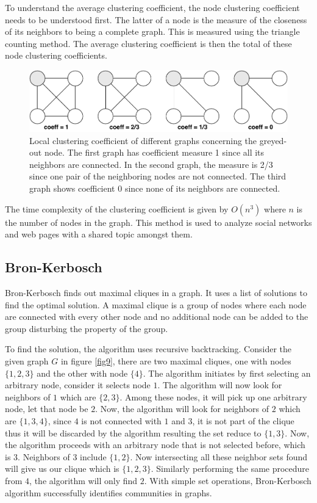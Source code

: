 \documentclass[journal,twoside,web]{ieeecolor}
\begin{document}
To understand the average clustering coefficient, the node clustering coefficient needs to be understood first. The latter of a node is the measure of the closeness of its neighbors to being a complete graph. This is measured using the triangle counting method. The average clustering coefficient is then the total of these node clustering coefficients.

\begin{figure}[!h]
    \centerline{\includegraphics[scale=0.51]{figures/node_clustering.pdf}}
    \caption{Local clustering coefficient of different graphs concerning the greyed-out node. The first graph has coefficient measure 1 since all its neighbors are connected. In the second graph, the measure is 2/3 since one pair of the neighboring nodes are not connected. The third graph shows coefficient 0 since none of its neighbors are connected.}
    \label{fig8}
\end{figure}

The time complexity of the clustering coefficient is given by $O(n^3)$ where $n$ is the number of nodes in the graph. This method is used to analyze social networks and web pages with a shared topic amongst them.

\subsection{Bron-Kerbosch}
Bron-Kerbosch finds out maximal cliques in a graph. It uses a list of solutions to find the optimal solution. A maximal clique is a group of nodes where each node are connected with every other node and no additional node can be added to the group disturbing the property of the group.

To find the solution, the algorithm uses recursive backtracking. Consider the given graph $G$ in figure \ref{fig9}, there are two maximal cliques, one with nodes $\{1, 2, 3\}$ and the other with node $\{4\}$. The algorithm initiates by first selecting an arbitrary node, consider it selects node $1$. The algorithm will now look for neighbors of $1$ which are $\{2, 3\}$. Among these nodes, it will pick up one arbitrary node, let that node be $2$. Now, the algorithm will look for neighbors of $2$ which are $\{1, 3, 4\}$, since $4$ is not connected with $1$ and $3$, it is not part of the clique thus it will be discarded by the algorithm resulting the set reduce to $\{1, 3\}$. Now, the algorithm proceeds with an arbitrary node that is not selected before, which is $3$. Neighbors of $3$ include $\{1, 2\}$. Now intersecting all these neighbor sets found will give us our clique which is $\{1, 2, 3\}$. Similarly performing the same procedure from $4$, the algorithm will only find $2$. With simple set operations, Bron-Kerbosch algorithm successfully identifies communities in graphs.
\end{document}
